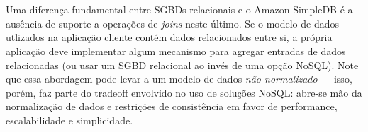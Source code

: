 \\\\ Uma diferença fundamental entre SGBDs relacionais e o Amazon SimpleDB é a ausência de suporte a operações de \textit{joins} neste último. Se o modelo de dados utlizados na aplicação cliente contém dados relacionados entre si, a própria aplicação deve implementar algum mecanismo para agregar entradas de dados relacionadas (ou usar um SGBD relacional ao invés de uma opção NoSQL). Note que essa abordagem pode levar a um modelo de dados \textit{não-normalizado} --- isso, porém, faz parte do tradeoff envolvido no uso de soluções NoSQL: abre-se mão da normalização de dados e restrições de consistência em favor de performance, escalabilidade e simplicidade.